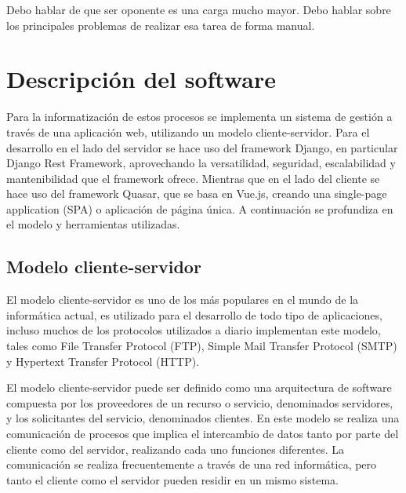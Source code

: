 Debo hablar de que ser oponente es una carga mucho mayor.
Debo hablar sobre los principales problemas de realizar esa tarea 
de forma manual.







\section{Descripción del software}
Para la informatización de estos procesos se implementa 
un sistema de gestión a través de una aplicación web,
utilizando un modelo cliente-servidor.
Para el desarrollo en el lado del servidor se hace uso del framework Django, en particular Django Rest Framework, aprovechando la
versatilidad, seguridad, escalabilidad y mantenibilidad
que el framework ofrece.
Mientras que en el lado del cliente se hace uso
del framework Quasar, que se basa en Vue.js, creando una
single-page application (SPA) o aplicación de página única.
A continuación se profundiza en el modelo 
y herramientas utilizadas.

\subsection{Modelo cliente-servidor}
El modelo cliente-servidor es uno de los más populares en
el mundo de la informática actual, es utilizado para el 
desarrollo de todo tipo de aplicaciones, incluso muchos 
de los protocolos utilizados a diario implementan este modelo,
tales como File Transfer Protocol (FTP), Simple Mail Transfer Protocol
(SMTP) y Hypertext Transfer Protocol (HTTP).

El modelo cliente-servidor puede ser definido como una arquitectura
de software compuesta por los proveedores de un recurso o servicio, 
denominados servidores, y los solicitantes del servicio, denominados
clientes. En este modelo se realiza una comunicación de procesos
que implica el intercambio de datos tanto por parte del cliente 
como del servidor, realizando cada uno funciones diferentes. La comunicación
se realiza frecuentemente a través de una red informática, pero 
tanto el cliente como el servidor pueden residir en un mismo sistema.

